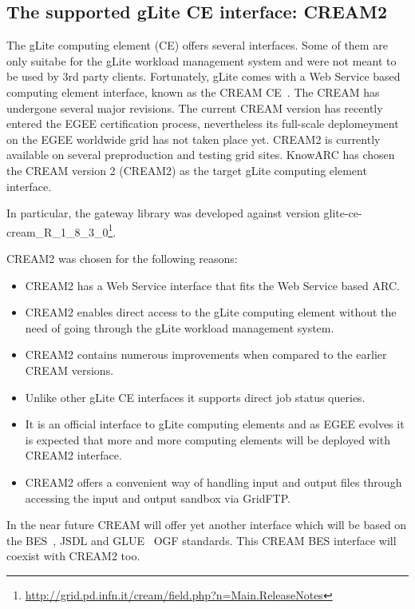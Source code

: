 \documentclass{article}
\begin{document}
\subsection{The supported gLite CE interface: CREAM2}
The gLite computing element (CE) offers several interfaces. Some of them are only suitabe for the gLite workload management system and were not meant to be used by 3rd party clients. Fortunately, gLite comes with a Web Service based computing element interface, known as the CREAM CE~\cite{cream}. The CREAM has undergone several major revisions. The current CREAM version has recently entered the EGEE certification process, nevertheless its full-scale deplomeyment on the EGEE worldwide grid has not taken place yet. CREAM2 is currently available on several preproduction and testing grid sites. KnowARC has chosen the CREAM version 2 (CREAM2) as the target gLite computing element interface.

In particular, the gateway library was developed against version glite-ce-cream\_R\_1\_8\_3\_0\footnote{\url{http://grid.pd.infn.it/cream/field.php?n=Main.ReleaseNotes}}.

CREAM2 was chosen for the following reasons:
\begin{itemize}
\item CREAM2 has a Web Service interface that fits the Web Service based ARC.
\item CREAM2 enables direct access to the gLite computing element without the need of going through the gLite workload management system.
\item CREAM2 contains numerous improvements when compared to the earlier CREAM versions.
\item Unlike other gLite CE interfaces it supports direct job status queries.
\item It is an official interface to gLite computing elements and as EGEE evolves it is expected that more and more computing elements will be deployed with CREAM2 interface.
\item CREAM2 offers a convenient way of handling input and output files through accessing the input and output sandbox via GridFTP.
\end{itemize}
In the near future CREAM will offer yet another interface which will be based on the BES~\cite{ogsa-bes}, JSDL and GLUE~\cite{glue} OGF standards. This CREAM BES interface will coexist with CREAM2 too.
\end{document}
